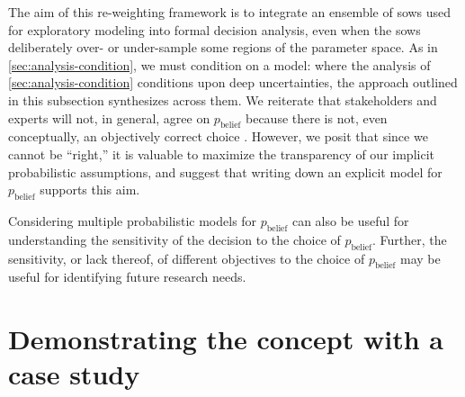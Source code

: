 \documentclass{agujournal2019}
\begin{document}
The aim of this re-weighting framework is to integrate an ensemble of \glspl{sow} used for exploratory modeling into formal decision analysis, even when the \glspl{sow} deliberately over- or under-sample some regions of the parameter space.
As in \cref{sec:analysis-condition}, we must condition on a model: where the analysis of \cref{sec:analysis-condition} conditions upon deep uncertainties, the approach outlined in this subsection synthesizes across them.
We reiterate that stakeholders and experts will not, in general, agree on $p_\mathrm{belief}$ because there is not, even conceptually, an objectively correct choice \cite{oreskes_verification:1994,walker_deep:2013}.
However, we posit that since we cannot be ``right,'' it is valuable to maximize the transparency of our implicit probabilistic assumptions, and suggest that writing down an explicit model for $p_\mathrm{belief}$ supports this aim.

Considering multiple probabilistic models for $p_\mathrm{belief}$ can also be useful for understanding the sensitivity of the decision to the choice of $p_\mathrm{belief}$.
Further, the sensitivity, or lack thereof, of different objectives to the choice of $p_\mathrm{belief}$ may be useful for identifying future research needs.

\section{Demonstrating the concept with a case study}\label{sec:case-study}
\end{document}
